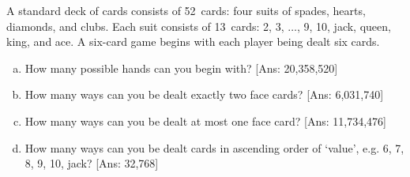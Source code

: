 \documentclass[11pt,letterpaper]{article}
\begin{document}
 A standard deck of cards consists of 52~cards: four suits of spades, hearts, diamonds, and clubs. Each suit consists of 13~cards: 2, 3, $\ldots$, 9, 10, jack, queen, king, and ace. A six-card game begins with each player being dealt six cards. 
	\begin{enumerate}[(a)]
	\item How many possible hands can you begin with? [Ans: 20,358,520]
	\item How many ways can you be dealt exactly two face cards? [Ans: 6,031,740]
	\item How many ways can you be dealt at most one face card? [Ans: 11,734,476]
	\item How many ways can you be dealt cards in ascending order of `value', e.g. 6, 7, 8, 9, 10, jack? [Ans: 32,768]
	\end{enumerate} \pspace
\end{document}
